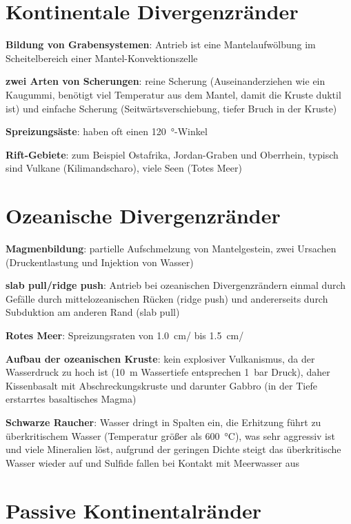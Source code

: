 \section{%
    Kontinentale Divergenzränder%
}

\textbf{Bildung von Grabensystemen}:
Antrieb ist eine Mantelaufwölbung im Scheitelbereich einer Mantel-Konvektionszelle

\textbf{zwei Arten von Scherungen}:
reine Scherung (Auseinanderziehen wie ein Kaugummi, benötigt viel Temperatur aus dem Mantel,
damit die Kruste duktil ist) und
einfache Scherung (Seitwärtsverschiebung, tiefer Bruch in der Kruste)

\textbf{Spreizungsäste}:
haben oft einen \SI{120}{\degree}-Winkel

\textbf{Rift-Gebiete}:
zum Beispiel Ostafrika, Jordan-Graben und Oberrhein,
typisch sind Vulkane (Kilimandscharo), viele Seen (Totes Meer)

\pagebreak

\section{%
    Ozeanische Divergenzränder%
}

\textbf{Magmenbildung}:
partielle Aufschmelzung von Mantelgestein,
zwei Ursachen (Druckentlastung und Injektion von Wasser)

\textbf{slab pull/ridge push}:
Antrieb bei ozeanischen Divergenzrändern einmal durch
Gefälle durch mittelozeanischen Rücken (ridge push) und andererseits durch
Subduktion am anderen Rand (slab pull)

\textbf{Rotes Meer}:
Spreizungsraten von \SI{1.0}{\centi\meter/\year} bis \SI{1.5}{\centi\meter/\year}

\textbf{Aufbau der ozeanischen Kruste}:
kein explosiver Vulkanismus, da der Wasserdruck zu hoch ist
(\SI{10}{\meter} Wassertiefe entsprechen \SI{1}{\bar} Druck),
daher Kissenbasalt mit Abschreckungskruste
und darunter Gabbro (in der Tiefe erstarrtes basaltisches Magma)

\textbf{Schwarze Raucher}:
Wasser dringt in Spalten ein,
die Erhitzung führt zu überkritischem Wasser (Temperatur größer als \SI{600}{\celsius}),
was sehr aggressiv ist und viele Mineralien löst,
aufgrund der geringen Dichte steigt das überkritische Wasser wieder auf und
Sulfide fallen bei Kontakt mit Meerwasser aus

\section{%
    Passive Kontinentalränder%
}

